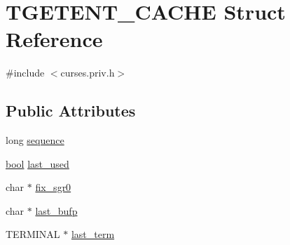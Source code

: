 \hypertarget{struct_t_g_e_t_e_n_t___c_a_c_h_e}{\section{T\-G\-E\-T\-E\-N\-T\-\_\-\-C\-A\-C\-H\-E Struct Reference}
\label{struct_t_g_e_t_e_n_t___c_a_c_h_e}
}


{\ttfamily \#include $<$curses.\-priv.\-h$>$}

\subsection*{Public Attributes}
\begin{DoxyCompactItemize}
\item 
long \hyperlink{struct_t_g_e_t_e_n_t___c_a_c_h_e_a36c972fccdf3a3568f66b19ab6a78327}{sequence}
\item 
\hyperlink{term__entry_8h_a002004ba5d663f149f6c38064926abac}{bool} \hyperlink{struct_t_g_e_t_e_n_t___c_a_c_h_e_ac60e2dba2671ebf776d4ad6cbc8605f4}{last\-\_\-used}
\item 
char $\ast$ \hyperlink{struct_t_g_e_t_e_n_t___c_a_c_h_e_a3d6c2e40e7eb2e42293ab872c5851317}{fix\-\_\-sgr0}
\item 
char $\ast$ \hyperlink{struct_t_g_e_t_e_n_t___c_a_c_h_e_a02e99668a6bf25b578e4b40cd34296af}{last\-\_\-bufp}
\item 
T\-E\-R\-M\-I\-N\-A\-L $\ast$ \hyperlink{struct_t_g_e_t_e_n_t___c_a_c_h_e_ae2d800898a0b625fdd1193c1b1c470a2}{last\-\_\-term}
\end{DoxyCompactItemize}


